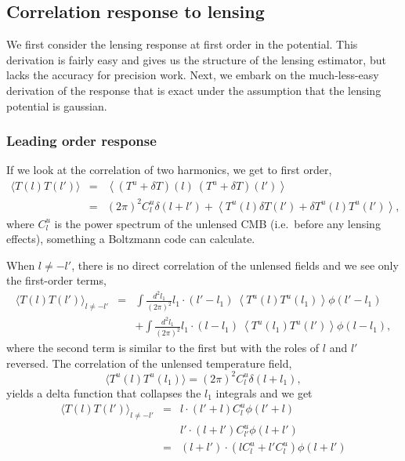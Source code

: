 \subsection{Correlation response to lensing} 

We first consider the lensing response at first order in the potential.  This derivation is fairly easy and gives us the structure of the lensing estimator, but lacks the accuracy for precision work.  Next, we embark on the much-less-easy derivation of the response that is exact under the assumption that the lensing potential is gaussian.

\subsubsection{Leading order response}

If we look at the correlation of two harmonics, we get to first order,
\begin{eqnarray}
  \langle T(l) T(l') \rangle &=&  \left\langle (T^u + \delta T)(l) \ (T^u+\delta T)(l') \right\rangle \\ \nonumber
  &=&  (2\pi)^2 C^u_l \delta(l +l')  + \left\langle T^u(l) \delta T(l')  +  \delta T^u(l) T^u(l') \right\rangle,
\end{eqnarray}
where $C^u_l$ is the power spectrum of the unlensed CMB (i.e.\ before any lensing effects), something a Boltzmann code can calculate.

When $l \neq -l'$, there is no direct correlation of the unlensed fields and we see only the first-order terms,
\begin{eqnarray}
  \langle T(l) T(l') \rangle_{l \neq -l'} &=&   \int \frac{d^2 l_1}{(2\pi)^2} l_1\cdot(l'-l_1) \ \left\langle T^u(l) T^u(l_1)\right\rangle \phi(l'-l_1)  \\ \nonumber
  && +   \int \frac{d^2 l_1}{(2\pi)^2} l_1\cdot(l-l_1) \ \left\langle T^u(l_1) T^u(l')\right\rangle \phi(l-l_1) , 
\end{eqnarray}
where the second term is similar to the first but with the roles of $l$ and $l'$ reversed.  The correlation of the unlensed temperature field,
\begin{equation}
  \langle T^u(l) T^u(l_1) \rangle = (2\pi)^2 C^u_l \delta(l + l_1),
\end{equation}
yields a delta function that collapses the $l_1$ integrals and we get
\begin{eqnarray}
  \langle T(l) T(l') \rangle_{l \neq -l'} &=& l \cdot (l' + l) C^u_l \phi(l' + l) \\ \nonumber
  &&  l' \cdot (l + l') C^u_{l'} \phi(l+l') \\ \nonumber
&=& (l+l') \cdot (l C^u_l + l' C^u_l) \phi(l+l')
\end{eqnarray}


